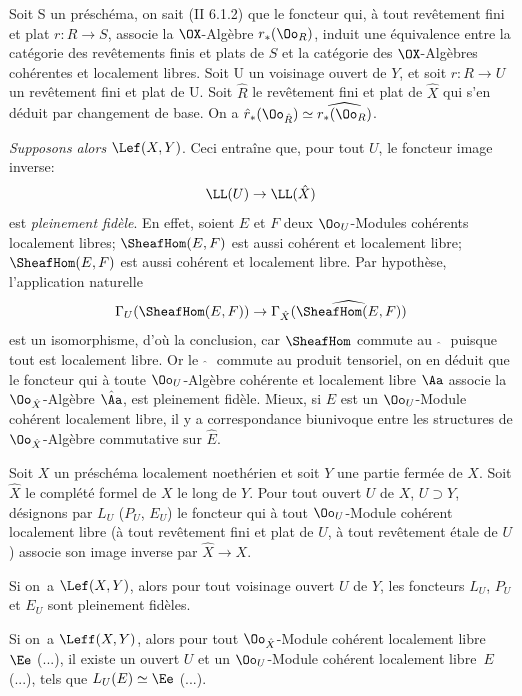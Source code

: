 Soit S un pr\'esch\'ema, on sait (\EGA II 6.1.2) que le foncteur qui, \`a tout rev\^etement fini et plat $r\colon R\to S$, associe la $\OX$-Alg\`ebre $r_\ast(\Oo_R)$, induit une \'equivalence entre la cat\'egorie des rev\^etements finis et plats de $S$ et la cat\'egorie des $\OX$-Alg\`ebres coh\'erentes et localement libres. Soit U un voisinage ouvert de $Y$, et soit $r\colon R\to U$ un rev\^etement fini et plat de U. Soit $\hat{R}$ le rev\^etement fini et plat de $\hat{X}$ qui s'en d\'eduit par changement de base. On a $\hat{r}_\ast(\Oo_{\hat{R}})\simeq\widehat{r_\ast(\Oo_R)}$.

\emph{Supposons alors} $\Lef(X, Y)$. Ceci entra\^ine que, pour tout $U$, le foncteur image inverse:
\[
\LL(U) \to \LL(\hat{X})
\]
est \emph{pleinement fid\`ele}. En effet, soient $E$ et $F$ deux $\Oo_U$-Modules coh\'erents localement libres; $\SheafHom(E, F)$ est aussi coh\'erent et localement libre; $\SheafHom(E, F)$ est aussi coh\'erent et localement libre. Par hypoth\`ese, l'application naturelle
\[
\Gamma_U (\SheafHom(E, F)) \to \Gamma_{\hat{X}}(\widehat{\SheafHom(E, F)})
\]
est un isomorphisme, d'o\`u la conclusion, car $\SheafHom$ commute au $\, \, \hat{}\, \, $ puisque tout est localement libre. Or le $\, \, \hat{}\, \, $ commute au produit tensoriel, on en d\'eduit que le foncteur qui \`a toute $\Oo_U$-Alg\`ebre coh\'erente et localement libre $\Aa$ associe la $\Oo_{\hat{X}}$-Alg\`ebre $\hat{\Aa}$, est pleinement fid\`ele. Mieux, si $E$ est un $\Oo_U$-Module coh\'erent localement libre\pageoriginale, il y a correspondance biunivoque entre les structures de $\Oo_{\hat{X}}$-Alg\`ebre commutative sur $\hat{E}$.

\begin{proposition} \label{X.2.3}
Soit $X$ un pr\'esch\'ema localement noeth\'erien et soit $Y$ une partie ferm\'ee de $X$. Soit $\hat{X}$ le compl\'et\'e formel de $X$ le long de $Y$. Pour tout ouvert $U$ de $X$, $U\supset Y$, d\'esignons par $L_U$ (\resp $P_U$, \resp $E_U$) le foncteur qui \`a tout $\Oo_U$-Module coh\'erent localement libre (\resp \`a tout rev\^etement fini et plat de $U$, \resp \`a tout rev\^etement \'etale de $U$) associe son image inverse par $\hat{X} \to X$.
\begin{enumeratei}
\item
Si on~a $\Lef(X, Y)$, alors pour tout voisinage ouvert $U$ de $Y$, les foncteurs $L_U$, $P_U$ et $E_U$ sont pleinement fid\`eles.

\item
Si on~a $\Leff(X, Y)$, alors pour tout $\Oo_{\hat{X}}$-Module coh\'erent localement libre~$\Ee$ (\resp ...), il existe un ouvert $U$ et un $\Oo_U$-Module coh\'erent localement libre~$E$ (\resp ...), tels que $L_U(E) \simeq \Ee$ (\resp ...).
\end{enumeratei}
\end{proposition}

